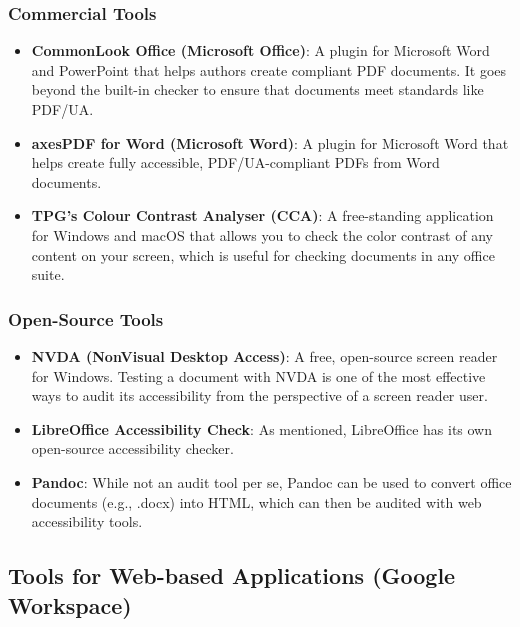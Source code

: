 \subsubsection{Commercial Tools}
\label{ssubsec:commercial-desktop-tools}
\begin{itemize}
	\item \textbf{CommonLook Office (Microsoft Office)}: A plugin for Microsoft Word and PowerPoint that helps authors create compliant PDF documents. It goes beyond the built-in checker to ensure that documents meet standards like PDF/UA.
	\item \textbf{axesPDF for Word (Microsoft Word)}: A plugin for Microsoft Word that helps create fully accessible, PDF/UA-compliant PDFs from Word documents.
	\item \textbf{TPG's Colour Contrast Analyser (CCA)}: A free-standing application for Windows and macOS that allows you to check the color contrast of any content on your screen, which is useful for checking documents in any office suite.
\end{itemize}

\subsubsection{Open-Source Tools}
\label{ssubsec:opensource-desktop-tools}
\begin{itemize}
	\item \textbf{NVDA (NonVisual Desktop Access)}: A free, open-source screen reader for Windows. Testing a document with NVDA is one of the most effective ways to audit its accessibility from the perspective of a screen reader user.
	\item \textbf{LibreOffice Accessibility Check}: As mentioned, LibreOffice has its own open-source accessibility checker.
	\item \textbf{Pandoc}: While not an audit tool per se, Pandoc can be used to convert office documents (e.g., .docx) into HTML, which can then be audited with web accessibility tools.
\end{itemize}

\subsection{Tools for Web-based Applications (Google Workspace)}
\label{subsec:web-audit-tools}

